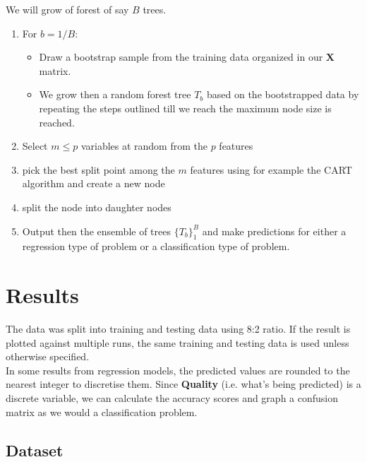 \documentclass[english,notitlepage,reprint,nofootinbib]{revtex4-1}
\begin{document}
We will grow of forest of say $B$ trees. 
\begin{enumerate}
	\item  For $b=1/B$: 
		\begin{itemize}
			\item Draw a bootstrap sample from the training data organized in our $\boldsymbol{X}$ matrix.
			\item We grow then a random forest tree $T_b$ based on the bootstrapped data by repeating the steps outlined till we reach the maximum node size is reached. 
		\end{itemize}

	\item Select $m \le p$ variables at random from the $p$ features
	\item pick the best split point among the $m$ features using for example the CART algorithm and create a new node
	\item split the node into daughter nodes
	\item Output then the ensemble of trees $\{T_b\}_1^{B}$ and make predictions for either a regression type of problem or a classification type of problem. 
\end{enumerate} \cite{hjorth-jensen}
%

\section{Results}\label{sec:results}
%
The data was split into training and testing data using 8:2 ratio. If the result is plotted against multiple runs, the same training and testing data is used unless otherwise specified. \\
In some results from regression models, the predicted values are rounded to the nearest integer to discretise them. Since \textbf{Quality} (i.e. what's being predicted) is a discrete variable, we can calculate the accuracy scores and graph a confusion matrix as we would a classification problem. 
\subsection{Dataset}
\end{document}
